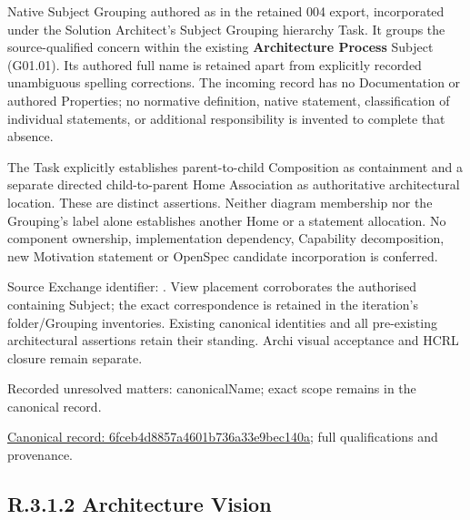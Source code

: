 Native Subject Grouping authored as \texttt{} in the retained 004 export,
incorporated under the Solution Architect's Subject Grouping hierarchy Task.
It groups the source-qualified \texttt{} concern within
the existing \textbf{Architecture Process} Subject (G01.01). Its authored full name
is retained apart from explicitly recorded unambiguous spelling corrections.
The incoming record has no Documentation or authored Properties; no normative
definition, native statement, classification of individual statements, or
additional responsibility is invented to complete that absence.



The Task explicitly establishes parent-to-child Composition as containment and
a separate directed child-to-parent Home Association as authoritative architectural
location. These are distinct assertions. Neither diagram membership nor the
Grouping's label alone establishes another Home or a statement allocation.
No component ownership, implementation dependency, Capability decomposition,
new Motivation statement or OpenSpec candidate incorporation is conferred.



Source Exchange identifier: \texttt{}. View placement corroborates
the authorised containing Subject; the exact correspondence is retained in the
iteration's folder/Grouping inventories. Existing canonical identities and all
pre-existing architectural assertions retain their standing. Archi visual
acceptance and HCRL closure remain separate.


{\small Recorded unresolved matters: canonicalName; exact scope remains in the canonical record.}\par
{\footnotesize \href{../../../../continuum/grouping/6fceb4d8857a4601b736a33e9bec140a.md}{Canonical record: 6fceb4d8857a4601b736a33e9bec140a}; full qualifications and provenance.}\par
\subsection*{R.3.1.2 Architecture Vision}
\label{navigation:R.3.1.2}

